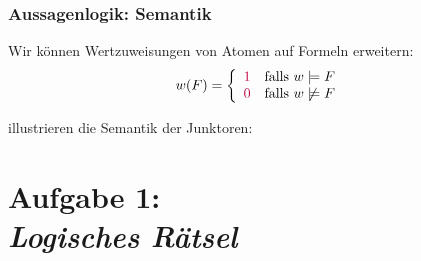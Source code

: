 \documentclass{beamer}
\begin{document}
	\begin{frame}\frametitle{Aussagenlogik: Semantik}
		\footnotesize
		Wir können Wertzuweisungen von Atomen auf Formeln erweitern:
		\begin{equation*}
			w(F)=\left\{\begin{array}{rl}\textcolor{purple}{1} & \text{falls } w\models F\\
			\textcolor{purple}{0} & \text{falls } w\not\models F
			\end{array}\right.
		\end{equation*}
		\pause
		
		 illustrieren die Semantik der Junktoren:\medskip
		
		\medskip
		
	\end{frame}
	
	

	\section{Aufgabe 1: \\ \itshape Logisches Rätsel}
\end{document}
